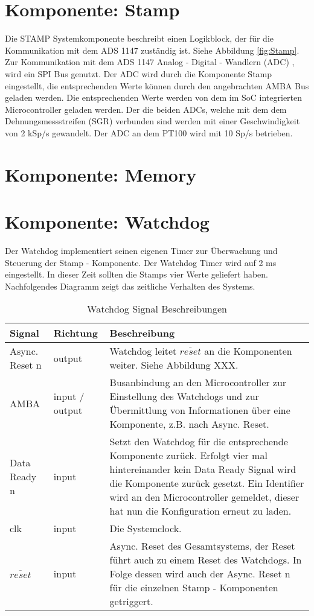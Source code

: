 \section{Komponente: Stamp}
\label{bes:Stamp}
Die STAMP Systemkomponente beschreibt einen Logikblock, der für die Kommunikation mit dem ADS 1147 zuständig ist. Siehe Abbildung \ref{fig:Stamp}. 
Zur Kommunikation mit dem ADS 1147 Analog - Digital - Wandlern (ADC) , wird ein SPI Bus genutzt. Der ADC wird durch die Komponente Stamp eingestellt, die entsprechenden Werte können durch den angebrachten AMBA Bus geladen werden. Die entsprechenden Werte werden von dem im SoC integrierten Microcontroller geladen werden. 
Der die beiden ADCs, welche mit dem dem Dehnungsmessstreifen (SGR) verbunden sind werden mit einer Geschwindigkeit von 2 kSp/s gewandelt. Der ADC an dem PT100 wird mit 10 Sp/s betrieben. 
\section{Komponente: Memory}
\label{bes:memory}
\section{Komponente: Watchdog}
Der Watchdog implementiert seinen eigenen Timer zur Überwachung und Steuerung der Stamp - Komponente. Der Watchdog Timer wird auf 2 ms eingestellt. In dieser Zeit sollten die Stamps vier Werte geliefert haben. Nachfolgendes Diagramm zeigt das zeitliche Verhalten des Systems. 
\renewcommand{\arraystretch}{1.5}
\begin{table}[htb]
  \begin{tabular}{|p{.3\linewidth}|p{.15\linewidth}|p{.45\linewidth}|}\hline
  \textbf{Signal} & \textbf{Richtung} & \textbf{Beschreibung} \\ \hline
  Async. Reset n & output & Watchdog leitet $\overline{reset}$ an die Komponenten weiter. Siehe Abbildung XXX. \\ \hline 
  AMBA & input / output & Busanbindung an den Microcontroller zur Einstellung des Watchdogs und zur Übermittlung von Informationen über eine Komponente, z.B. nach Async. Reset. \\ \hline
  Data Ready n & input & Setzt den Watchdog für die entsprechende Komponente zurück. Erfolgt vier mal hintereinander kein Data Ready Signal wird die Komponente zurück gesetzt. Ein Identifier wird an den Microcontroller gemeldet, dieser hat nun die Konfiguration erneut zu laden. \\ \hline
  clk & input & Die Systemclock. \\ \hline 
  $\overline{reset} $ & input & Async. Reset des Gesamtsystems, der Reset führt auch zu einem Reset des Watchdogs. In Folge dessen wird auch der Async. Reset n für die einzelnen Stamp  - Komponenten getriggert. \\ \hline
  \end{tabular}
   \caption{Watchdog Signal Beschreibungen}
\end{table}
\renewcommand{\arraystretch}{1.0}

